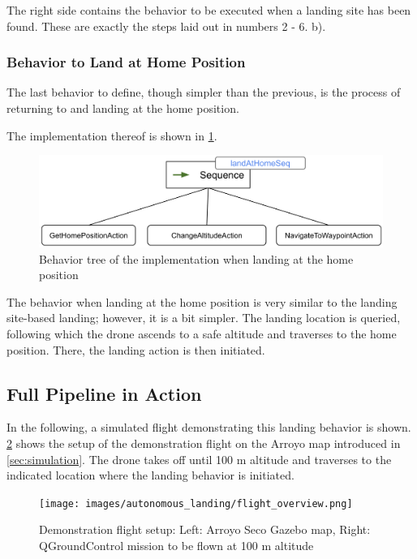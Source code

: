 The right side contains the behavior to be executed when a landing site has been found. These are exactly the steps laid out in numbers 2 - 6. b).


\subsubsection{Behavior to Land at Home Position}

The last behavior to define, though simpler than the previous, is the process of returning to and landing at the home position. 

The implementation thereof is shown in \cref{fig:bt_land_at_home}.

\begin{figure}[h]
\centering
\includegraphics[scale=0.2]{images/autonomous_landing/land_at_home_beh.png}
\caption{Behavior tree of the implementation when landing at the home position}
\label{fig:bt_land_at_home}
\end{figure}

The behavior when landing at the home position is very similar to the landing site-based landing; however, it is a bit simpler. The landing location is queried, following which the drone ascends to a safe altitude and traverses to the home position. There, the landing action is then initiated.

\subsection{Full Pipeline in Action}

In the following, a simulated flight demonstrating this landing behavior is shown. \cref{fig:demo_flight_setup} shows the setup of the demonstration flight on the Arroyo map introduced in \cref{sec:simulation}. The drone takes off until 100 m altitude and traverses to the indicated location where the landing behavior is initiated.

\begin{figure}[h]
\centering
\texttt{[image: images/autonomous\_landing/flight\_overview.png]}
\caption{Demonstration flight setup: Left: Arroyo Seco Gazebo map, Right: QGroundControl mission to be flown at 100 m altitude}
\label{fig:demo_flight_setup}
\end{figure}


